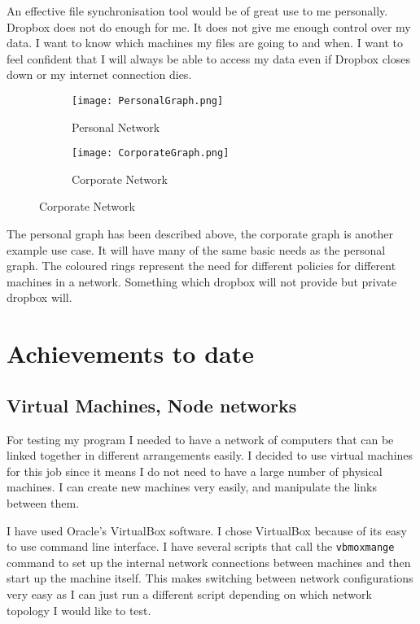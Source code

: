 \documentclass[12pt]{article}
\begin{document}
An effective file synchronisation tool would be of
great use to me personally. Dropbox does not do enough
for me. It does not give me enough control over my data.
I want to know which machines my files are going to and when.
I want to feel confident that I will always be able to access
my data even if Dropbox closes down or my internet connection
dies.

\begin{figure}[htb]
    \begin{subfigure}[b]{0.5\textwidth}
        \centering
        \texttt{[image: PersonalGraph.png]}
        \caption{Personal Network}
        \label{fig:personal_graph}
    \end{subfigure}
    \begin{subfigure}[b]{0.5\textwidth}
        \texttt{[image: CorporateGraph.png]}
        \caption{Corporate Network}
        \label{fig:corp_graph}
    \end{subfigure}
\end{figure}

The personal graph has been described above, the corporate graph
is another example use case. It will have many of the same
basic needs as the personal graph. The coloured rings represent
the need for different policies for different machines in a network.
Something which dropbox will not provide but private dropbox will.

\section{Achievements to date}
\subsection{Virtual Machines, Node networks}
For testing my program I needed to have a network
of computers that can be linked together in different
arrangements easily. I decided to use virtual machines for
this job since it means I do not need to have a large number
of physical machines.  I can create new machines very easily, and manipulate the
links between them.

I have used Oracle's VirtualBox software. I chose
VirtualBox because of its easy to use command
line interface. I have several scripts that
call the \texttt{vbmoxmange} command to set up the internal
network connections between machines and then start up
the machine itself. This makes switching between
network configurations very easy as I can just
run a different script depending on which network
topology I would like to test.
\end{document}
